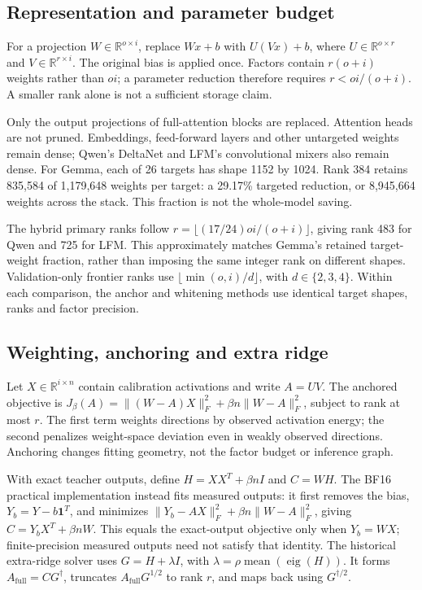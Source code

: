\documentclass[10pt]{article}
\begin{document}
\subsection{Representation and parameter budget}

For a projection $W\in\mathbb{R}^{o\times i}$, replace $Wx+b$ with $U(Vx)+b$, where $U\in\mathbb{R}^{o\times r}$ and $V\in\mathbb{R}^{r\times i}$. The original bias is applied once. Factors contain $r(o+i)$ weights rather than $oi$; a parameter reduction therefore requires $r<oi/(o+i)$. A smaller rank alone is not a sufficient storage claim.

Only the output projections of full-attention blocks are replaced. Attention heads are not pruned. Embeddings, feed-forward layers and other untargeted weights remain dense; Qwen's DeltaNet and LFM's convolutional mixers also remain dense. For Gemma, each of 26 targets has shape 1152 by 1024. Rank 384 retains 835,584 of 1,179,648 weights per target: a 29.17\% targeted reduction, or 8,945,664 weights across the stack. This fraction is not the whole-model saving.

The hybrid primary ranks follow $r=\lfloor(17/24)oi/(o+i)\rfloor$, giving rank 483 for Qwen and 725 for LFM. This approximately matches Gemma's retained target-weight fraction, rather than imposing the same integer rank on different shapes. Validation-only frontier ranks use $\lfloor\min(o,i)/d\rfloor$, with $d\in\{2,3,4\}$. Within each comparison, the anchor and whitening methods use identical target shapes, ranks and factor precision.

\subsection{Weighting, anchoring and extra ridge}

Let $X\in\mathbb{R}^{i\times n}$ contain calibration activations and write $A=UV$. The anchored objective is $J_\beta(A)=\|(W-A)X\|_F^2+\beta n\|W-A\|_F^2$, subject to rank at most $r$. The first term weights directions by observed activation energy; the second penalizes weight-space deviation even in weakly observed directions. Anchoring changes fitting geometry, not the factor budget or inference graph.

With exact teacher outputs, define $H=XX^T+\beta nI$ and $C=WH$. The BF16 practical implementation instead fits measured outputs: it first removes the bias, $Y_b=Y-b\mathbf{1}^T$, and minimizes $\|Y_b-AX\|_F^2+\beta n\|W-A\|_F^2$, giving $C=Y_bX^T+\beta nW$. This equals the exact-output objective only when $Y_b=WX$; finite-precision measured outputs need not satisfy that identity. The historical extra-ridge solver uses $G=H+\lambda I$, with $\lambda=\rho\operatorname{mean}(\operatorname{eig}(H))$. It forms $A_{\mathrm{full}}=CG^\dagger$, truncates $A_{\mathrm{full}}G^{1/2}$ to rank $r$, and maps back using $G^{\dagger/2}$.
\end{document}
